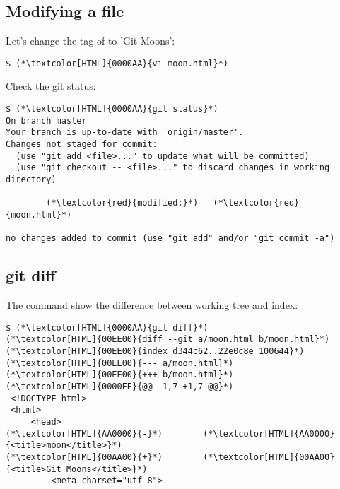 \subsection{Modifying a file}
\begin{frame}[fragile]
  \subslidetitle

  Let's change the  tag of  to 'Git Moons':
  \begin{lstlisting}
$ (*\textcolor[HTML]{0000AA}{vi moon.html}*)
\end{lstlisting}

  Check the git status:
  \begin{lstlisting}
$ (*\textcolor[HTML]{0000AA}{git status}*)
On branch master
Your branch is up-to-date with 'origin/master'.
Changes not staged for commit:
  (use "git add <file>..." to update what will be committed)
  (use "git checkout -- <file>..." to discard changes in working directory)

        (*\textcolor{red}{modified:}*)   (*\textcolor{red}{moon.html}*)

no changes added to commit (use "git add" and/or "git commit -a")
\end{lstlisting}
\end{frame}

\subsection{git diff}
\begin{frame}[fragile]
  \subslidetitle

  The command  show the difference between working tree and index:
  \begin{lstlisting}
$ (*\textcolor[HTML]{0000AA}{git diff}*)
(*\textcolor[HTML]{00EE00}{diff --git a/moon.html b/moon.html}*)
(*\textcolor[HTML]{00EE00}{index d344c62..22e0c8e 100644}*)
(*\textcolor[HTML]{00EE00}{--- a/moon.html}*)
(*\textcolor[HTML]{00EE00}{+++ b/moon.html}*)
(*\textcolor[HTML]{0000EE}{@@ -1,7 +1,7 @@}*)
 <!DOCTYPE html>
 <html>
     <head>
(*\textcolor[HTML]{AA0000}{-}*)        (*\textcolor[HTML]{AA0000}{<title>moon</title>}*)
(*\textcolor[HTML]{00AA00}{+}*)        (*\textcolor[HTML]{00AA00}{<title>Git Moons</title>}*)
         <meta charset="utf-8">
  \end{lstlisting}
\end{frame}

